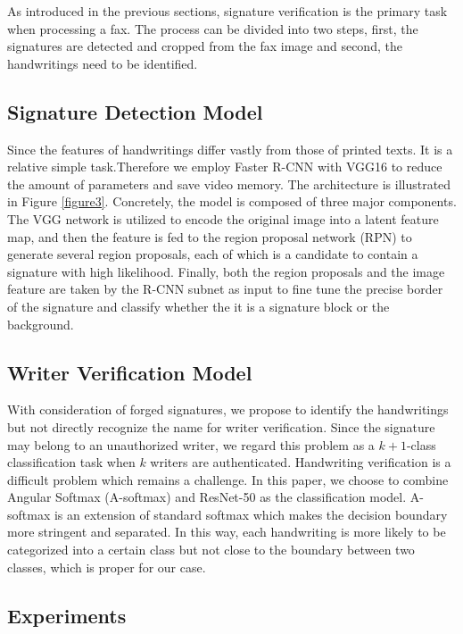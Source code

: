 \documentclass[sigconf]{acmart}
\begin{document}
As introduced in the previous sections, signature verification is the primary task when processing a fax. The process can be divided into two steps, first, the signatures are detected and cropped from the fax image and second, the handwritings need to be identified.
\subsection{Signature Detection Model}
Since the features of handwritings differ vastly from those of printed texts. It is a relative simple task.Therefore we employ Faster R-CNN \cite{ren2015faster} with VGG16 \cite{simonyan2014very} to reduce the amount of parameters and save video memory. The architecture is illustrated in Figure \ref{figure3}. Concretely, the model is composed of three major components. The VGG network is utilized to encode the original image into a latent feature map, and then the feature is fed to the region proposal network (RPN) to generate several region proposals, each of which is a candidate to contain a signature with high likelihood. Finally, both the region proposals and the image feature are taken by the R-CNN subnet as input to fine tune the precise border of the signature and classify whether the it is a signature block or the background.

\subsection{Writer Verification Model}
With consideration of forged signatures, we propose to identify the handwritings but not directly recognize the name for writer verification. Since the signature may belong to an unauthorized writer, we regard this problem as a $k+1$-class classification task when $k$ writers are authenticated. Handwriting verification is a difficult problem which remains a challenge. In this paper, we choose to combine Angular Softmax (A-softmax) \cite{liu2017sphereface} and ResNet-50 \cite{he2016deep} as the classification model. A-softmax is an extension of standard softmax which makes the decision boundary more stringent and separated. In this way, each handwriting is more likely to be categorized into a certain class but not close to the boundary between two classes, which is proper for our case. 

\subsection{Experiments}
\end{document}
